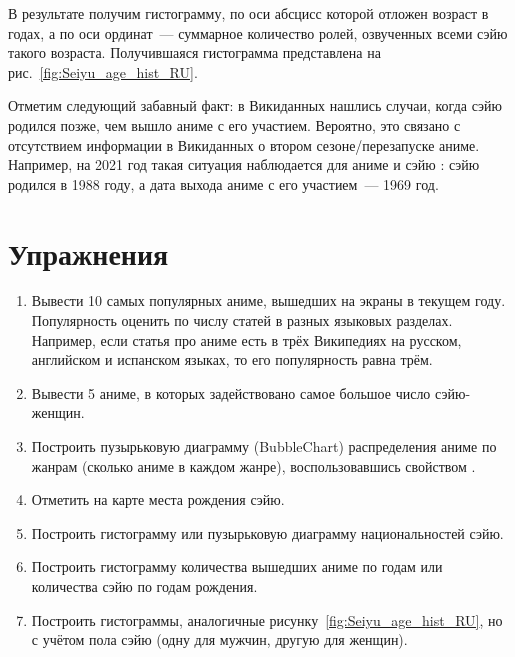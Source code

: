 В результате получим гистограмму, по оси абсцисс которой отложен возраст в годах, а по оси ординат~--- суммарное количество ролей, озвученных всеми сэйю такого возраста. Получившаяся гистограмма представлена на рис.~\ref{fig:Seiyu_age_hist_RU}. 

\begin{figure*}[h]

    \setlength{\fboxsep}{0pt}%
    \setlength{\fboxrule}{1pt}%
	\caption[Гистограмма с числом аниме, озвученных сэйю разных возрастов, 2021.]{Гистограмма с числом аниме, озвученных различными сэйю, 2021. Гистограмма построена на основе данных, полученных с помощью запросов~\protect\ref{lst:seiyu_bd_w_service} (или~\protect\ref{lst:seiyu_bd_w_rdfs}), \protect\ref{lst:all_anime_releases} и \protect\ref{lst:link_anime_seiyu}.}%
    \label{fig:Seiyu_age_hist_RU}%
\end{figure*} 
 	
Отметим следующий забавный факт: в Викиданных нашлись случаи, когда сэйю родился позже, чем вышло аниме с его участием. Вероятно, это связано с отсутствием информации в Викиданных о втором сезоне/перезапуске аниме. Например, на 2021 год такая ситуация наблюдается для аниме  и сэйю : сэйю родился в 1988 году, а дата выхода аниме с его участием~--- 1969 год.

\newpage

\section{Упражнения}

\begin{enumerate}
    \item Вывести 10 самых популярных аниме, вышедших на экраны в текущем году. Популярность оценить по числу статей в разных языковых разделах. Например, если статья про аниме есть в трёх Википедиях на русском, английском и испанском языках, то его популярность равна трём. 
    \item Вывести 5 аниме, в которых задействовано самое большое число сэйю-женщин.
    \item Построить пузырьковую диаграмму (BubbleChart) распределения аниме по жанрам (сколько аниме в каждом жанре), воспользовавшись свойством .
    \item Отметить на карте места рождения сэйю.
    \item Построить гистограмму или пузырьковую диаграмму национальностей сэйю.
    \item Построить гистограмму количества вышедших аниме по годам или количества сэйю по годам рождения.
    \item Построить гистограммы, аналогичные рисунку~\ref{fig:Seiyu_age_hist_RU}, но с учётом пола сэйю (одну для мужчин, другую для женщин).
\end{enumerate}
